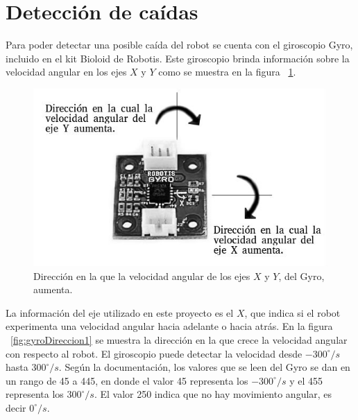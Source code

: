 \section{Detecci\'on de ca\'idas}

Para poder detectar una posible caída del robot se cuenta con el giroscopio Gyro, incluido en el kit Bioloid de Robotis. Este giroscopio brinda información sobre la velocidad angular en los ejes $X$ y $Y$ como se muestra en la figura ~\ref{fig:gyroDireccion}.

\begin{figure}[hbtp]
\centering
\includegraphics[scale=0.5]{imagenes/gyroDireccion.jpg}
\caption{Dirección en la que la velocidad angular de los ejes $X$ y $Y$, del Gyro, aumenta.}
\label{fig:gyroDireccion}
\end{figure}

La información del eje utilizado en este proyecto es el $X$, que indica si el robot experimenta una velocidad angular hacia adelante o hacia atrás. En la figura ~\ref{fig:gyroDireccion1} se muestra la direcci\'on en la que crece la velocidad angular con respecto al robot. El giroscopio puede detectar la velocidad desde $-300^{\circ}/s$ hasta $300^{\circ} /s$. Según la documentación, los valores que se leen del Gyro se dan en un rango de 45 a 445, en donde el valor 45 representa los $-300^{\circ}/s$ y el 455 representa los $300^{\circ} /s$. El valor 250 indica que no hay movimiento angular, es decir $0^{\circ}/s$. %

